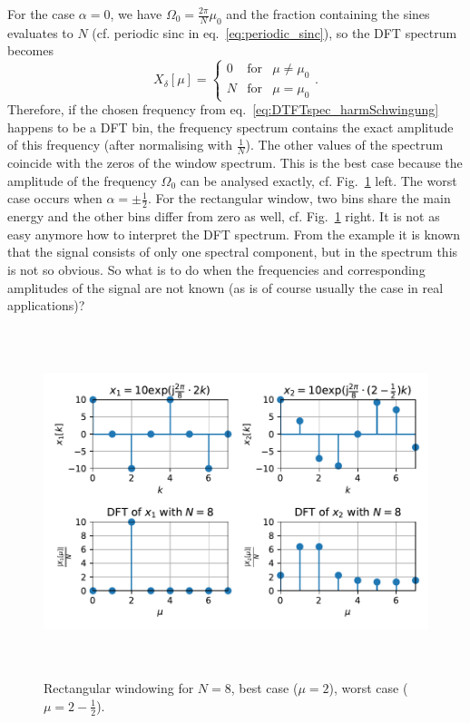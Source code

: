 \documentclass[11pt,a4paper,DIV=12]{scrartcl}
\begin{document}
%
For the case $\alpha=0$, we have $\Omega_0=\frac{2\pi}{N}\mu_0$ and the fraction
containing the sines evaluates to $N$ (cf. periodic sinc in
eq.~\eqref{eq:periodic_sinc}), so the DFT spectrum becomes
%
\begin{equation}
X_\delta[\mu]=\left\{\begin{matrix}0 & \text{for} & \mu\neq\mu_0\\N & \text{for} & \mu=\mu_0\end{matrix}\right..
\end{equation}
%
Therefore, if the chosen frequency from eq.~\eqref{eq:DTFTspec_harmSchwingung}
happens to be a DFT bin, the frequency spectrum contains the exact amplitude of
this frequency (after normalising with $\frac{1}{N}$).
%
The other values of the spectrum coincide with the zeros of the window spectrum.
%
This is the best case because the amplitude of the frequency $\Omega_0$ can be
analysed exactly, cf. Fig.~\ref{DFTbestworstcase_RectWin} left.
%
The worst case occurs when $\alpha=\pm\frac{1}{2}$.
%
For the rectangular window, two bins share the main energy and the other bins
differ from zero as well, cf. Fig.~\ref{DFTbestworstcase_RectWin} right.
%
It is not as easy anymore how to interpret the DFT spectrum.
%
From the example it is known that the signal consists of only one spectral
component, but in the spectrum this is not so obvious.
%
So what is to do when the frequencies and corresponding amplitudes of the signal
are not known (as is of course usually the case in real applications)?
%
\begin{figure}
		\centering
		\includegraphics[width=6in, height=4in]{graphics/DFTbestworstcase_RectWin.pdf}
		\caption{Rectangular windowing for $N=8$,
		best case ($\mu=2$), worst case ($\mu=2-\frac{1}{2}$).}
		\label{DFTbestworstcase_RectWin}
\end{figure}
\end{document}
